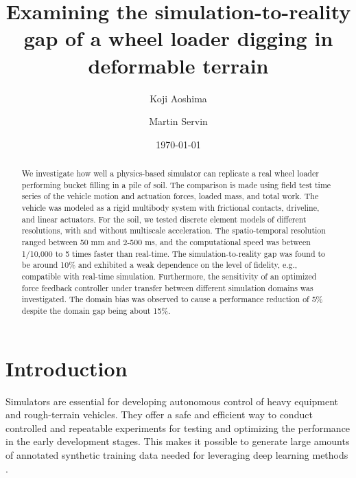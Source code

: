 \documentclass[10pt]{article}
\begin{document}
\title{Examining the simulation-to-reality gap of a wheel loader digging in deformable terrain}

\author[1,2]{Koji Aoshima}
\author[2,3]{Martin Servin}

\date{\today}

\maketitle

\begin{abstract}
We investigate how well a physics-based simulator can replicate a real wheel loader performing bucket filling in a pile of soil. The comparison is made using 
field test time series of the vehicle motion and actuation forces, loaded mass, and total work.
The vehicle was modeled as a rigid multibody system with frictional contacts, driveline, and 
linear actuators. For the soil, we tested discrete element models of different resolutions, 
with and without multiscale acceleration. The spatio-temporal resolution ranged between 50 mm and 2-500 ms, and the computational speed 
was between 1/10,000 to 5 times faster than real-time.
The simulation-to-reality gap was found to be around 10\% and exhibited a weak dependence on the level of fidelity, 
e.g., compatible with real-time simulation. Furthermore, the sensitivity of an optimized force feedback 
controller under transfer between different simulation domains was investigated. 
The domain bias was observed to cause a performance reduction of 5\% despite
the domain gap being about 15\%.
\end{abstract}




\section{Introduction}
\label{sec:introduction}
Simulators are essential for developing autonomous control of heavy equipment and rough-terrain vehicles. 
They offer a safe and efficient way to conduct controlled and repeatable experiments for testing and optimizing 
the performance in the early development stages. 
This makes it possible to generate large amounts of annotated synthetic 
training data needed for leveraging deep learning methods \cite{Matsumoto2020,Kurinov2020,backman2021,wiberg:2021:crt,Egli2022b}.
																														  
\end{document}
